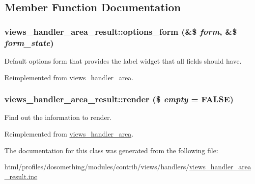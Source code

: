 \subsection{Member Function Documentation}
\hypertarget{classviews__handler__area__result_a8b6ec38182e50197cf1289acfac7b26e}{
\subsubsection[{options\_\-form}]{\setlength{\rightskip}{0pt plus 5cm}views\_\-handler\_\-area\_\-result::options\_\-form (\&\$ {\em form}, \/  \&\$ {\em form\_\-state})}}
\label{classviews__handler__area__result_a8b6ec38182e50197cf1289acfac7b26e}
Default options form that provides the label widget that all fields should have. 

Reimplemented from \hyperlink{classviews__handler__area_af3615e22fccc744485ddb7978ce812ff}{views\_\-handler\_\-area}.\hypertarget{classviews__handler__area__result_acd805154305ee5849da8251a4335c933}{
\subsubsection[{render}]{\setlength{\rightskip}{0pt plus 5cm}views\_\-handler\_\-area\_\-result::render (\$ {\em empty} = {\ttfamily FALSE})}}
\label{classviews__handler__area__result_acd805154305ee5849da8251a4335c933}
Find out the information to render. 

Reimplemented from \hyperlink{classviews__handler__area_a9f3eb4b8ee98a0929946e8de7253d302}{views\_\-handler\_\-area}.

The documentation for this class was generated from the following file:\begin{DoxyCompactItemize}
\item 
html/profiles/dosomething/modules/contrib/views/handlers/\hyperlink{views__handler__area__result_8inc}{views\_\-handler\_\-area\_\-result.inc}\end{DoxyCompactItemize}
